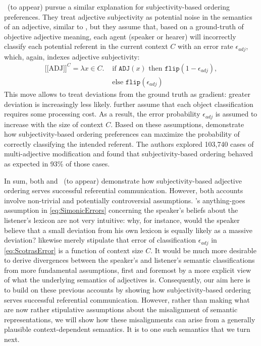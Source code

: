 \documentclass[10pt,a4paper]{article}
\newcommand{\sem}[1]{\mbox{$[\![$#1$]\!]$}}
\begin{document}
\citeauthor{scontrasetalSPadjectives}~(to appear) pursue a similar explanation for subjectivity-based ordering preferences. They treat adjective subjectivity as potential noise in the semantics of an adjective, similar to \citeauthor{simonic2018}, but they assume that, based on a ground-truth of objective adjective meaning, each agent (speaker or hearer) will incorrectly classify each potential referent in the current context $C$ with an error rate $\epsilon_{adj}$, which, again, indexes adjective subjectivity:
\begin{align}
  \label{eq:ScotrasError}
  \sem{ADJ}^C  = \lambda x \in C. & \textrm{ if } \texttt{ADJ}(x) \textrm{ then } 
  \texttt{flip}(1- \epsilon_{adj}),\\
  &  \textrm{ else } \texttt{flip}(\epsilon_{adj}) \nonumber
\end{align}
This move allows \citeauthor{scontrasetalSPadjectives} to treat deviations from the ground truth as gradient: greater deviation is increasingly less likely. \citeauthor{scontrasetalSPadjectives} further assume that each object classification requires some processing cost. As a result, the error probability $\epsilon_{adj}$ is assumed to increase with the size of context $C$. Based on these assumptions, \citeauthor{scontrasetalSPadjectives} demonstrate how subjectivity-based ordering preferences can maximize the probability of correctly classifying the intended referent. The authors explored 103,740 cases of multi-adjective modification and found that subjectivity-based ordering behaved as expected in 93\% of those cases.

In sum, both  and \citeauthor{scontrasetalSPadjectives}~(to appear) demonstrate how subjectivity-based adjective ordering serves successful referential communication. However, both accounts involve non-trivial and potentially controversial assumptions. \citeauthor{simonic2018}'s anything-goes assumption in \eqref{eq:SimonicErrors} concerning the speaker's beliefs about the listener's lexicon are not very intuitive: why, for instance, would the speaker believe that a small deviation from his own lexicon is equally likely as a massive deviation?  likewise merely stipulate that error of classification $\epsilon_{adj}$ in \eqref{eq:ScotrasError} is a function of context size $C$. It would be much more desirable to derive divergences between the speaker's and listener's semantic classifications from more fundamental assumptions, first and foremost by a more explicit view of what the underlying semantics of adjectives is. Consequently, our aim here is to build on these previous accounts by showing how subjectivity-based ordering serves successful referential communication. However, rather than making what are now rather stipulative assumptions about the misalignment of semantic representations, we will show how these misalignments can arise from a generally plausible context-dependent semantics. It is to one such semantics that we turn next.
\end{document}

